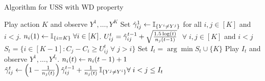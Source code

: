 \begin{center}
\begin{minipage}{0.48\textwidth}
		\begin{algorithm}[H]
			\caption{Algorithm for USS with WD property} %
			\label{alg:UCB}
			\begin{algorithmic}[1]
				\STATE Play action $K$ and observe $Y^1,\dots,Y^K$
				\STATE Set $\hat{\gamma}_{ij}^1 \leftarrow \mathbb{I}_{\{Y^i\ne Y^j\}}$ for all $i,j\in [K]$ and $i < j$.
				\STATE $n_i(1)\leftarrow \mathbb{I}_{\{i=K\}} \; \forall i\in [K]$.
				\STATE $U_{ij}^t=\hat{\gamma}_{ij}^{t-1} + \sqrt{\frac{1.5\log(t)}{n_j(t-1)}}$  $\;\forall \; i,j \in [K]$ and $i<j$ \label{algo:UCB}
				\STATE $S_t=\{i \in [K-1]: C_j-C_i \geq U_{ij}^t \;\forall \;   j > i \}$ \label{algo:sort}
				\STATE Set $I_t= \arg \min S_t \cup \{K\} $
				\STATE Play $I_t$ and observe $Y^1,\dots,Y^{I_t}$.
				\STATE $n_i(t) \leftarrow n_i(t-1)+1$\\
				 \STATE $\hat{\gamma}_{ij}^t \leftarrow \left (1-\frac{1}{n_j(t)}\right )
				 \hat{\gamma}_{ij}^{t-1} + \frac{1}{n_j(t)} \,\mathbb{I}_{\{Y^j\ne Y^i\}} \forall \; i<j \leq I_t$ \label{algo:Update}
				\ENDFOR
				\ENDFOR
			\end{algorithmic}
		\end{algorithm}
	\end{minipage}
\end{center}

